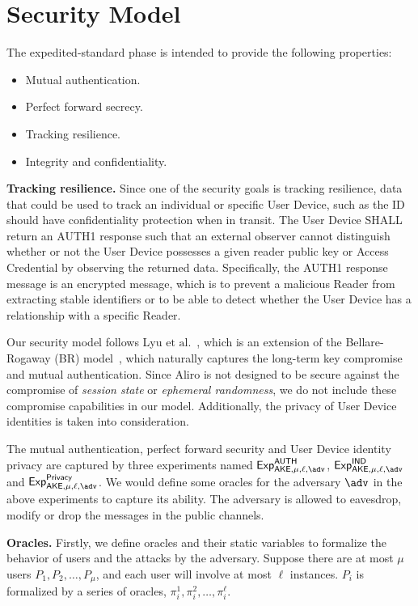 \documentclass[a4paper,11pt]{article}
\newcommand{\et}{\text{et al.}}
\begin{document}
\begin{sloppypar}
\section{Security Model}

The expedited-standard phase is intended to provide the following properties:
\begin{itemize}
    \item Mutual authentication.
    \item Perfect forward secrecy.
    \item Tracking resilience.
    \item Integrity and confidentiality.
\end{itemize}

\noindent\textbf{Tracking resilience.}
Since one of the security goals is tracking resilience, data that could be used to track an individual or specific User Device, such as the ID should have confidentiality protection when in transit.
The User Device SHALL return an {\sf AUTH1 response} such that an external observer cannot distinguish whether or not the User Device possesses a given reader public key or Access Credential by observing the returned data.
Specifically, the {\sf AUTH1 response} message is an encrypted message, which is to prevent a malicious Reader from extracting stable identifiers or to be able to detect whether the User Device has a relationship with a specific Reader.

Our security model follows Lyu $\et$~\cite{AC:LLHG22}, which is an extension of the Bellare-Rogaway (BR) model~\cite{C:BelRog93}, which naturally captures the long-term key compromise and mutual authentication.
Since Aliro is not designed to be secure against the compromise of {\it session state} or {\it ephemeral randomness}, we do not include these compromise capabilities in our model.
Additionally, the privacy of User Device identities is taken into consideration.

The mutual authentication, perfect forward security and User Device identity privacy are captured by three experiments named ${\sf Exp}_{\mathsf{AKE},\mu,\ell,\adv}^{\mathsf{AUTH}}$, ${\sf Exp}_{\mathsf{AKE},\mu,\ell,\adv}^{\mathsf{IND}}$ and ${\sf Exp}_{\mathsf{AKE},\mu,\ell,\adv}^{\mathsf{Privacy}}$.
We would define some oracles for the adversary $\adv$ in the above experiments to capture its ability.
The adversary is allowed to eavesdrop, modify or drop the messages in the public channels.

\medskip\noindent\textbf{Oracles.}
Firstly, we define oracles and their static variables to formalize the behavior of users and the attacks by the adversary. Suppose there are at most $\mu$ users $P_1, P_2, \ldots, P_\mu$, and each user will involve at most $\ell$ instances. $P_i$ is formalized by a series of oracles, $\pi_i^1, \pi_i^2, \ldots, \pi_i^\ell$.


\end{sloppypar}
\end{document}
